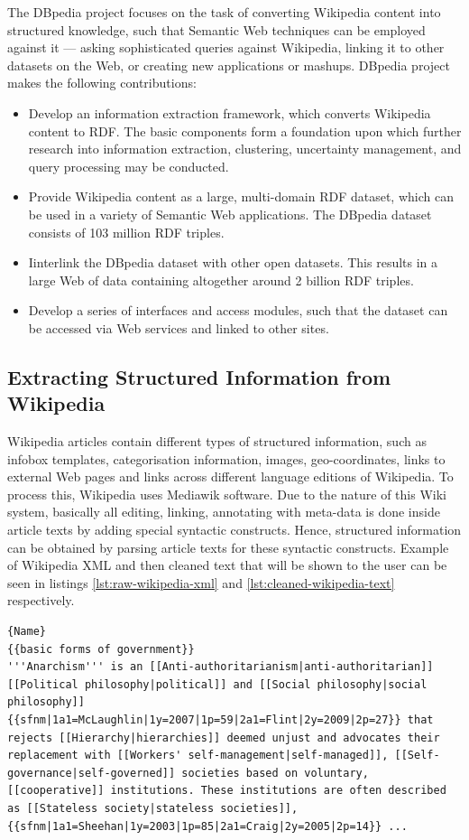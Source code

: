 \documentclass[thesis=M,english,hidelinks]{FITthesis}[2019/12/23]
\begin{document}
The DBpedia project focuses on the task of converting Wikipedia content into structured knowledge, such that Semantic Web techniques can be employed against it — asking sophisticated queries against Wikipedia, linking it to other datasets on the Web, or creating new applications or mashups. DBpedia project makes the following contributions:
\begin{itemize}
	\item Develop an information extraction framework, which converts Wikipedia
	content to RDF. The basic components form a foundation upon which further research into information extraction, clustering, uncertainty management, and query processing may be conducted.
	\item Provide Wikipedia content as a large, multi-domain RDF dataset, which
	can be used in a variety of Semantic Web applications. The DBpedia dataset
	consists of 103 million RDF triples.
	\item Iinterlink the DBpedia dataset with other open datasets. This results in
	a large Web of data containing altogether around 2 billion RDF triples.
	\item Develop a series of interfaces and access modules, such that the dataset
	can be accessed via Web services and linked to other sites.
\end{itemize}

\subsection{Extracting Structured Information from Wikipedia}
Wikipedia articles contain different types of structured information, such as infobox templates, categorisation information, images, geo-coordinates, links to external Web pages and links across different language editions of Wikipedia. To process this, Wikipedia uses Mediawik software. Due to the nature of this  Wiki system, basically all editing, linking, annotating with meta-data is done inside article texts by adding special syntactic constructs. Hence, structured information can be obtained by parsing article texts for these syntactic constructs. Example of Wikipedia XML and then cleaned text that will be shown to the user can be seen in listings \ref{lst:raw-wikipedia-xml} and \ref{lst:cleaned-wikipedia-text} respectively. 

\begin{lstlisting}[caption=Raw Wikipedia XML,frame=tlrb,  label = {lst:raw-wikipedia-xml}]{Name}
{{basic forms of government}}
'''Anarchism''' is an [[Anti-authoritarianism|anti-authoritarian]] [[Political philosophy|political]] and [[Social philosophy|social philosophy]]{{sfnm|1a1=McLaughlin|1y=2007|1p=59|2a1=Flint|2y=2009|2p=27}} that rejects [[Hierarchy|hierarchies]] deemed unjust and advocates their replacement with [[Workers' self-management|self-managed]], [[Self-governance|self-governed]] societies based on voluntary, [[cooperative]] institutions. These institutions are often described as [[Stateless society|stateless societies]],{{sfnm|1a1=Sheehan|1y=2003|1p=85|2a1=Craig|2y=2005|2p=14}} ...
\end{lstlisting}
\end{document}
